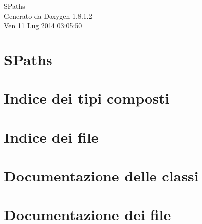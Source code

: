 \documentclass{book}
\begin{document}
\hypersetup{pageanchor=false,citecolor=blue}
\begin{titlepage}
\vspace*{7cm}
\begin{center}
{\Large S\-Paths }\\
\vspace*{1cm}
{\large Generato da Doxygen 1.8.1.2}\\
\vspace*{0.5cm}
{\small Ven 11 Lug 2014 03:05:50}\\
\end{center}
\end{titlepage}
\clearemptydoublepage
{}
\tableofcontents
\clearemptydoublepage
{}
\hypersetup{pageanchor=true,citecolor=blue}
\chapter{S\-Paths}
\label{index}\hypertarget{index}{}
\chapter{Indice dei tipi composti}

\chapter{Indice dei file}

\chapter{Documentazione delle classi}



\chapter{Documentazione dei file}








\printindex
\end{document}
